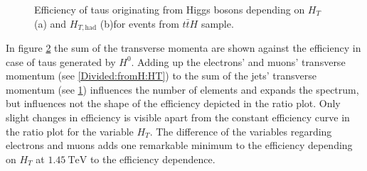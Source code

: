 \begin{figure}
\begin{subfigure}[t]{0.49\textwidth}
                \label{Divided:fromH:HThad}
                \end{subfigure}
\caption[Efficiency of taus originating from Higgs bosons for events from $t\bar{t}H$ sample.]{Efficiency of taus originating from Higgs bosons depending on $H_{T}$ (a) and $H_{T,\text{had}}$ (b)for events from $t\bar{t}H$ sample.}
\label{Divided:fromH:HTgedöns}
\end{figure}
%
In figure \ref{Divided:fromH:HTgedöns} the sum of the transverse momenta are shown against the efficiency in case of taus generated by $H^0$. Adding up the electrons' and muons' transverse momentum (see \ref{Divided:fromH:HT}) to the sum of the jets' transverse momentum (see \ref{Divided:fromH:HThad}) influences the number of elements and expands the spectrum, but influences not the shape of the efficiency depicted in the ratio plot. Only slight changes in efficiency is visible apart from the constant efficiency curve in the ratio plot for the variable $H_T$. The difference of the variables regarding electrons and muons adds one remarkable minimum to the efficiency depending on $H_T$ at $\SI{1.45}{\tera\electronvolt}$ to the efficiency dependence.\newline %
%
%
